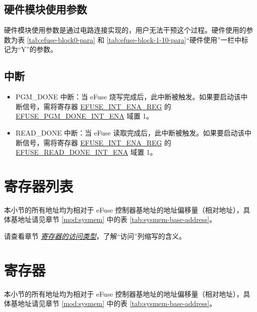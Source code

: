 \documentclass[main\_\_CN.tex]{subfiles}
\begin{document}



\subsection{硬件模块使用参数}

硬件模块使用参数是通过电路连接实现的，用户无法干预这个过程。硬件使用的参数为表 \ref{tab:efuse-block0-para} 和 \ref{tab:efuse-block-1-10-para}“硬件使用”一栏中标记为“Y”的参数。

\subsection{中断}
\begin{itemize}
\item PGM\_DONE 中断：当 eFuse 烧写完成后，此中断被触发。如果要启动该中断信号，需将寄存器 \hyperref[regdesc:EFUSEINTENAREG]{EFUSE\_INT\_ENA\_REG} 的 \hyperref[fielddesc:EFUSEPGMDONEINTENA]{EFUSE\_PGM\_DONE\_INT\_ENA} 域置 1。
\item READ\_DONE 中断：当 eFuse 读取完成后，此中断被触发。如果要启动该中断信号，需将寄存器 \hyperref[regdesc:EFUSEINTENAREG]{EFUSE\_INT\_ENA\_REG} 的 \hyperref[fielddesc:EFUSEREADDONEINTENA]{EFUSE\_READ\_DONE\_INT\_ENA} 域置 1。
\end{itemize}




\clearpage
\section{寄存器列表}
\label{sec:efuse-reg-summ}
\hypertarget{efuse-reg-summ}{}

本小节的所有地址均为相对于 eFuse 控制器基地址的地址偏移量（相对地址），具体基地址请见章节 \ref{mod:sysmem} \textit{} 中的表 \ref{tab:sysmem-base-address}。

请查看章节 \hyperref[glossary-access-types]{\textit{寄存器的访问类型}}，了解“访问”列缩写的含义。





\clearpage
\section{寄存器}

本小节的所有地址均为相对于 eFuse 控制器基地址的地址偏移量（相对地址），具体基地址请见章节 \ref{mod:sysmem} \textit{} 中的表 \ref{tab:sysmem-base-address}。


\end{document}
